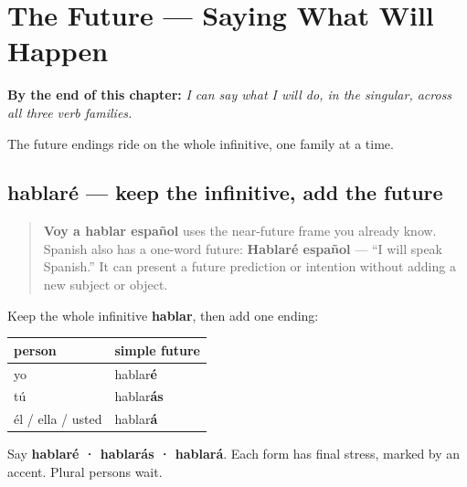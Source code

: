 
\chapter{The Future --- Saying What Will Happen}
\label{ch:spanish-futuro}

\begin{chapteropening}
\textbf{By the end of this chapter:} \emph{I can say what I will do, in the singular, across all three verb families.}

The future endings ride on the whole infinitive, one family at a time.
\end{chapteropening}

\section[hablaré]{hablaré — keep the infinitive, add the future}

\label{lesson:ES-C17-futuro}



\begin{quote}
\textbf{Voy a hablar español} uses the near-future frame you already know. Spanish also has a one-word future: \textbf{Hablaré español} — “I will speak Spanish.” It can present a future prediction or intention without adding a new subject or object.
\end{quote}

\begin{grammarlens}[title={Grammar Lens: three familiar persons}]
Keep the whole infinitive \textbf{hablar}, then add one ending:

\noindent
\begin{tabularx}{\linewidth}{@{}>{\raggedright\arraybackslash}X>{\raggedright\arraybackslash}X@{}}
\toprule
\textbf{person} & \textbf{simple future} \\
\midrule
yo & hablar\textbf{é} \\
tú & hablar\textbf{ás} \\
él / ella / usted & hablar\textbf{á} \\
\bottomrule
\end{tabularx}

Say \textbf{hablaré · hablarás · hablará}. Each form has final stress, marked by an accent. Plural persons wait.
\end{grammarlens}

